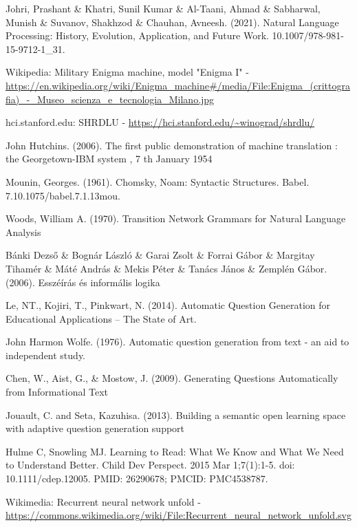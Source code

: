\documentclass[12pt,a4paper]{report}
\begin{document}
\begin{thebibliography}{100}
 Johri, Prashant \& Khatri, Sunil Kumar \& Al-Taani, Ahmad \& Sabharwal, Munish \& Suvanov, Shakhzod \& Chauhan, Avneesh. (2021). Natural Language Processing: History, Evolution, Application, and Future Work. 10.1007/978-981-15-9712-1\_31.

 Wikipedia: Military Enigma machine, model "Enigma I" - \url{https://en.wikipedia.org/wiki/Enigma_machine#/media/File:Enigma_(crittografia)_-_Museo_scienza_e_tecnologia_Milano.jpg}

 hci.stanford.edu: SHRDLU - \url{https://hci.stanford.edu/~winograd/shrdlu/}

 John Hutchins. (2006). The first public demonstration of machine translation : the Georgetown-IBM system , 7 th January 1954

 Mounin, Georges. (1961). Chomsky, Noam: Syntactic Structures. Babel. 7.10.1075/babel.7.1.13mou.

 Woods, William A. (1970). Transition Network Grammars for Natural Language Analysis

 Bánki Dezső \& Bognár László \& Garai Zsolt \& Forrai Gábor \& Margitay Tihamér \& Máté András \& Mekis Péter \& Tanács János \& Zemplén Gábor. (2006). Esszéírás és informális logika

 Le, NT., Kojiri, T., Pinkwart, N. (2014). Automatic Question Generation for Educational Applications – The State of Art.

 John Harmon Wolfe. (1976). Automatic question generation from text - an aid to independent study.

 Chen, W., Aist, G., \& Mostow, J. (2009). Generating Questions Automatically from Informational Text

 Jouault, C. and Seta, Kazuhisa. (2013). Building a semantic open learning space with adaptive question generation support

 Hulme C, Snowling MJ. Learning to Read: What We Know and What We Need to Understand Better. Child Dev Perspect. 2015 Mar 1;7(1):1-5. doi: 10.1111/cdep.12005. PMID: 26290678; PMCID: PMC4538787.

 Wikimedia: Recurrent neural network unfold - \url{https://commons.wikimedia.org/wiki/File:Recurrent_neural_network_unfold.svg}


\end{thebibliography}
\end{document}
